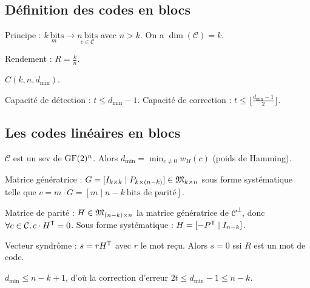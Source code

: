\subsection{Définition des codes en blocs}

	Principe : $\underset{m}{k\ \text{bits}} \longrightarrow \underset{c \in \mathcal{C}}{n\ \text{bits}}$ avec $n > k$.
	On a $\dim(\mathcal{C}) = k$.
	
	\begin{defn}
		Rendement : $R = \frac{k}{n}$.
	\end{defn}
	
	\begin{note}
		$C(k,n,d_\min)$.
	\end{note}
	
	\begin{defn}
		Capacité de détection : $t \leq d_\min - 1$. Capacité de correction : $t \leq \lfloor \frac{d_\min - 1}{2} \rfloor$.
	\end{defn}
	
\subsection{Les codes linéaires en blocs}

	$\mathcal{C}$ est un sev de $\mathrm{GF}(2)^n$.
	Alors $d_\min = \min_{c \neq 0} w_H(c)$ (poids de Hamming).

	\begin{defn}
		Matrice génératrice : $G = [ I_{k \times k} \mid P_{k \times (n - k)} ] \in \mathfrak{M}_{k \times n}$ sous forme systématique telle que $c = m \cdot G = [ m \mid n - k\ \text{bits de parité}]$.
	\end{defn}

	\begin{defn}
		Matrice de parité : $H \in \mathfrak{M}_{(n - k) \times n}$ la matrice génératrice de $\mathcal{C}^\perp$, donc $\forall c \in \mathcal{C}, c \cdot H^\mathsf{T} = 0$.
		Sous forme systématique : $H = [ -P^\mathsf{T} \mid I_{n - k}]$.
	\end{defn}

	\begin{defn}
		Vecteur syndrôme : $s = r H^\mathsf{T}$ avec $r$ le mot reçu.
		Alors $s = 0$ ssi $R$ est un mot de code.
	\end{defn}

	\begin{thm}
		$d_\min \leq n - k + 1$, d'où la correction d'erreur $2t \leq d_\min - 1 \leq n - k$.
	\end{thm}


